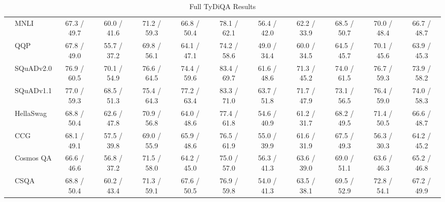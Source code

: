 \documentclass[11pt,a4paper]{article}
\begin{document}
\begin{table*}[t!]
{\begin{tabular}{llcccccccccc}
& MNLI & 67.3 / 49.7 & 60.0 / 41.6 & 71.2 / 59.3 & 66.8 / 50.4 & 78.1 / 62.1 & 56.4 / 42.0 & 62.2 / 33.9 & 68.5 / 50.7 & 70.0 / 48.4 & 66.7 / 48.7 \\
& QQP & 67.8 / 49.0 & 55.7 / 37.2 & 69.8 / 56.1 & 64.1 / 47.1 & 74.2 / 58.6 & 49.0 / 34.4 & 60.0 / 34.5 & 64.5 / 45.7 & 70.1 / 45.6 & 63.9 / 45.3 \\
& SQuADv2.0 & 76.9 / 60.5 & 70.1 / 54.9 & 76.6 / 64.5 & 74.4 / 59.6 & 83.4 / 69.7 & 61.6 / 48.6 & 71.3 / 45.2 & 74.0 / 61.5 & 76.7 / 59.3 & 73.9 / 58.2 \\
& SQuADv1.1 & 77.0 / 59.3 & 68.5 / 51.3 & 75.4 / 64.3 & 77.2 / 63.4 & 83.3 / 71.0 & 63.7 / 51.8 & 71.7 / 47.9 & 73.1 / 56.5 & 76.4 / 59.0 & 74.0 / 58.3 \\
& HellaSwag & 68.8 / 50.4 & 62.6 / 47.8 & 70.9 / 56.8 & 64.0 / 48.6 & 77.4 / 61.8 & 54.6 / 40.9 & 61.2 / 31.7 & 68.2 / 49.5 & 71.4 / 50.5 & 66.6 / 48.7 \\
& CCG & 68.1 / 49.1 & 57.5 / 39.8 & 69.0 / 55.9 & 65.9 / 48.6 & 76.5 / 61.9 & 55.0 / 39.9 & 61.6 / 31.9 & 67.5 / 49.3 & 56.3 / 30.3 & 64.2 / 45.2 \\
& Cosmos QA & 66.6 / 46.6 & 56.8 / 37.2 & 71.5 / 58.0 & 64.2 / 45.0 & 75.0 / 57.0 & 56.3 / 41.3 & 63.6 / 39.0 & 69.0 / 51.1 & 63.6 / 46.3 & 65.2 / 46.8 \\
& CSQA & 68.8 / 50.4 & 60.2 / 43.4 & 71.3 / 59.1 & 67.6 / 50.5 & 76.9 / 59.8 & 54.0 / 41.3 & 63.5 / 38.1 & 69.5 / 52.9 & 72.8 / 54.1 & 67.2 / 49.9 \\
\bottomrule
\end{tabular}
}
\caption{Full TyDiQA Results}
\label{tab:full_tydiqa}
\end{table*}
\end{document}
